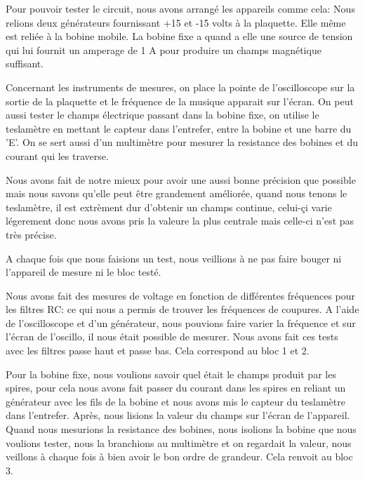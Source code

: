 

Pour pouvoir tester le circuit, nous avons arrangé les appareils comme cela: Nous relions deux générateurs fournissant +15 et 
-15 volts à la plaquette.  Elle même est reliée à la bobine mobile.  La bobine fixe a quand a elle une source de tension qui 
lui fournit un amperage de 1 A pour produire un champs magnétique suffisant.


Concernant les instruments de mesures, on place la pointe de l'oscilloscope sur la sortie de la plaquette et le fréquence
de la musique apparait sur l'écran.  On peut aussi tester le champs électrique passant dans la bobine fixe, on utilise le
teslamètre en mettant le capteur dans l'entrefer, entre la bobine et une barre du 'E'.  On se sert aussi d'un multimètre
pour mesurer la resistance des bobines et du courant qui les traverse.


Nous avons fait de notre mieux pour avoir une aussi bonne précision que possible mais nous savons qu'elle peut être grandement
améliorée, quand nous tenons le teslamètre, il est extrèment dur d'obtenir un champs continue, celui-çi varie légerement donc
nous avons pris la valeure la plus centrale mais celle-ci n'est pas très précise.


A chaque fois que nous faisions un test, nous veillions à ne pas faire bouger ni l'appareil de mesure ni le bloc testé.

Nous avons fait des mesures de voltage en fonction de différentes fréquences pour les filtres RC: ce qui nous a permis
de trouver les fréquences de coupures. A l'aide de l'oscilloscope et d'un générateur, nous pouvions faire varier
la fréquence et sur l'écran de l'oscillo, il nous était possible de mesurer.  Nous avons fait ces tests avec les filtres passe haut et passe bas.  Cela correspond 
au bloc 1 et 2.

Pour la bobine fixe, nous voulions savoir quel était le champs produit par les spires, pour cela nous avons fait passer
du courant dans les spires en reliant un générateur avec les fils de la bobine et nous avons mis le capteur du teslamètre 
dans l'entrefer.  Après, nous lisions la valeur du champs sur l'écran de l'appareil.
Quand nous mesurions la resistance des bobines, nous isolions la bobine que nous voulions tester, nous la branchions au multimètre
et on regardait la valeur, nous veillons à chaque fois à bien avoir le bon ordre de grandeur. Cela renvoit au bloc 3.

